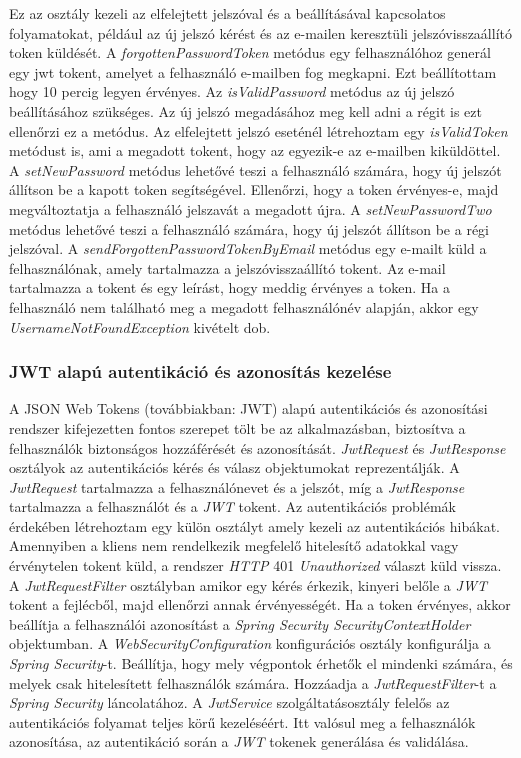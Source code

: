 Ez az osztály kezeli az elfelejtett jelszóval és a beállításával kapcsolatos folyamatokat, például az új jelszó kérést és az e-mailen keresztüli jelszóvisszaállító token küldését. A \textit{forgottenPasswordToken} metódus egy felhasználóhoz generál egy jwt tokent, amelyet a felhasználó e-mailben fog megkapni. Ezt beállítottam hogy 10 percig legyen érvényes. Az \textit{isValidPassword} metódus az új jelszó beállításához szükséges. Az új jelszó megadásához meg kell adni a régit is ezt ellenőrzi ez a metódus. Az elfelejtett jelszó eseténél létrehoztam egy \textit{isValidToken} metódust is, ami a megadott tokent, hogy az egyezik-e az e-mailben kiküldöttel. A \textit{setNewPassword} metódus lehetővé teszi a felhasználó számára, hogy új jelszót állítson be a kapott token segítségével. Ellenőrzi, hogy a token érvényes-e, majd megváltoztatja a felhasználó jelszavát a megadott újra. A \textit{setNewPasswordTwo} metódus lehetővé teszi a felhasználó számára, hogy új jelszót állítson be a régi jelszóval. A \textit{sendForgottenPasswordTokenByEmail} metódus egy e-mailt küld a felhasználónak, amely tartalmazza a jelszóvisszaállító tokent. Az e-mail tartalmazza a tokent és egy leírást, hogy meddig érvényes a token. Ha a felhasználó nem található meg a megadott felhasználónév alapján, akkor egy \textit{UsernameNotFoundException} kivételt dob.

\subsubsection{JWT alapú autentikáció és azonosítás kezelése}

A JSON Web Tokens (továbbiakban: JWT) \cite{JSON Web Tokens} alapú autentikációs és azonosítási rendszer kifejezetten fontos szerepet tölt be az alkalmazásban, biztosítva a felhasználók biztonságos hozzáférését és azonosítását. \textit{JwtRequest} és \textit{JwtResponse} osztályok az autentikációs kérés és válasz objektumokat reprezentálják. A \textit{JwtRequest} tartalmazza a felhasználónevet és a jelszót, míg a \textit{JwtResponse} tartalmazza a felhasználót és a \textit{JWT} tokent. Az autentikációs problémák érdekében létrehoztam egy külön osztályt amely kezeli az autentikációs hibákat. Amennyiben a kliens nem rendelkezik megfelelő hitelesítő adatokkal vagy érvénytelen tokent küld, a rendszer \textit{HTTP} 401 \textit{Unauthorized} választ küld vissza. A \textit{JwtRequestFilter} osztályban amikor egy kérés érkezik, kinyeri belőle a \textit{JWT} tokent a fejlécből, majd ellenőrzi annak érvényességét. Ha a token érvényes, akkor beállítja a felhasználói azonosítást a \textit{Spring Security SecurityContextHolder} objektumban. A \textit{WebSecurityConfiguration} konfigurációs osztály konfigurálja a \textit{Spring Security}-t. Beállítja, hogy mely végpontok érhetők el mindenki számára, és melyek csak hitelesített felhasználók számára. Hozzáadja a \textit{JwtRequestFilter}-t a \textit{Spring Security} láncolatához. A \textit{JwtService} szolgáltatásosztály felelős az autentikációs folyamat teljes körű kezeléséért. Itt valósul meg a felhasználók azonosítása, az autentikáció során a \textit{JWT} tokenek generálása és validálása. 


